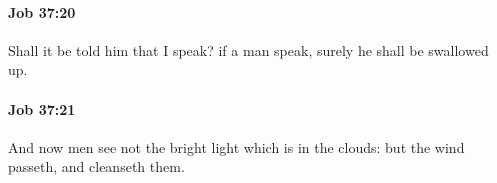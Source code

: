 		\paragraph{Job 37:20} %
			\label{JOB-37-20}

			Shall it be told him that I speak? if a man speak, surely he shall be swallowed up.


		\paragraph{Job 37:21} %
			\label{JOB-37-21}

			And now men see not the bright light which is in the clouds: but the wind passeth, and cleanseth them.


